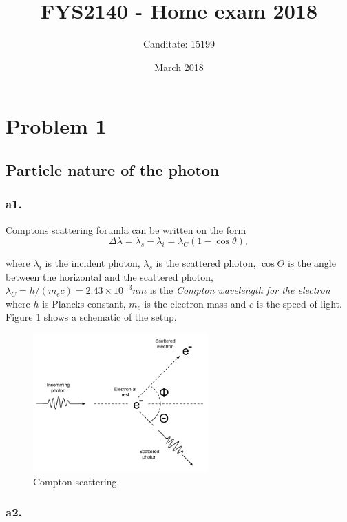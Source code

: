 \documentclass{article}
\title{FYS2140 - Home exam 2018}
\author{Canditate: 15199}
\date{March 2018}
\begin{document}
\maketitle

\section*{Problem 1}

\subsection*{Particle nature of the photon}

\subsubsection*{a1.}


Comptons scattering forumla can be written on the form
\begin{equation}
\Delta \lambda = \lambda_{s} - \lambda_{i} = \lambda_C(1 - \cos{\theta}),
\end{equation}

where $\lambda_{i}$ is the incident photon, $\lambda_{s}$ is the scattered photon, $\cos{\Theta}$ is the angle between the horizontal and the scattered photon, $\lambda_C = h/(m_ec) = 2.43\times 10^{-3}nm$ is the \textit{Compton wavelength for the electron} where $h$ is Plancks constant, $m_c$ is the electron mass and $c$ is the speed of light. Figure 1 shows a schematic of the setup.

\begin{figure}[t]
\centering
\includegraphics[width=0.6\textwidth]{comptonscattering}
\caption{Compton scattering.}
\label{fig:figure_label}
\end{figure}

\subsubsection*{a2.}
\end{document}
